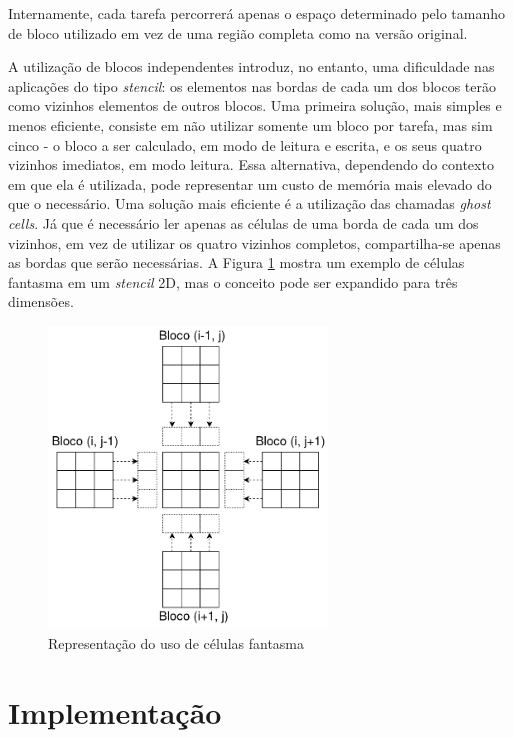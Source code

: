 \documentclass[cic,tc]{iiufrgs}
\begin{document}
Internamente, cada tarefa percorrerá apenas o espaço determinado pelo tamanho de bloco utilizado em vez de uma região completa como na versão original.

A utilização de blocos independentes introduz, no entanto, uma dificuldade nas aplicações do tipo \textit{stencil}: os elementos nas bordas de cada um dos blocos terão como vizinhos
elementos de outros blocos. Uma primeira solução, mais simples e menos eficiente, consiste em não utilizar somente um bloco por tarefa, mas sim cinco - o bloco a ser calculado, em
modo de leitura e escrita, e os seus quatro vizinhos imediatos, em modo leitura. Essa alternativa, dependendo do contexto em que ela é utilizada, pode representar um custo de memória mais
elevado do que o necessário. Uma solução mais eficiente é a utilização das chamadas \textit{ghost cells}. Já que é necessário ler apenas as células de uma borda de cada um dos vizinhos, em
vez de utilizar os quatro vizinhos completos, compartilha-se apenas as bordas que serão necessárias. A Figura \ref{fig:ghost_cells} mostra um exemplo de células fantasma em um \textit{stencil} 2D,
mas o conceito pode ser expandido para três dimensões.

\begin{figure}[!htb]
    \caption{Representação do uso de células fantasma}
    \begin{center}
      \includegraphics[width=20em]{ghost_cells}
    \end{center}
    \label{fig:ghost_cells}
\end{figure}

\section{Implementação}
\end{document}
